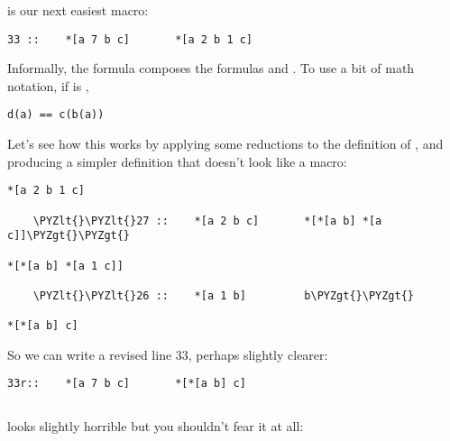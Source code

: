  is our next easiest macro:

\begin{framed_shaded}
\begin{Verbatim}[fontsize=\relsize{-2.5},fontseries=b,commandchars=\\\{\}]
33 ::    *[a 7 b c]       *[a 2 b 1 c]
\end{Verbatim}
\end{framed_shaded}
Informally, the formula \kode{[7 b c]} composes the formulas  and
.  To use a bit of math notation, if  is \kode{[7 b c]},

\begin{framed_shaded}
\begin{Verbatim}[fontsize=\relsize{-2.5},fontseries=b,commandchars=\\\{\}]
d(a) == c(b(a))
\end{Verbatim}
\end{framed_shaded}
Let's see how this works by applying some reductions to the
definition of , and producing a simpler definition that
doesn't look like a macro:

\begin{framed_shaded}
\begin{Verbatim}[fontsize=\relsize{-2.5},fontseries=b,commandchars=\\\{\}]
*[a 2 b 1 c]

    \PYZlt{}\PYZlt{}27 ::    *[a 2 b c]       *[*[a b] *[a c]]\PYZgt{}\PYZgt{}

*[*[a b] *[a 1 c]]

    \PYZlt{}\PYZlt{}26 ::    *[a 1 b]         b\PYZgt{}\PYZgt{}

*[*[a b] c]
\end{Verbatim}
\end{framed_shaded}
So we can write a revised line 33, perhaps slightly clearer:

\begin{framed_shaded}
\begin{Verbatim}[fontsize=\relsize{-2.5},fontseries=b,commandchars=\\\{\}]
33r::    *[a 7 b c]       *[*[a b] c]
\end{Verbatim}
\end{framed_shaded}

\subsection{}

 looks slightly horrible but you shouldn't fear it at all:


